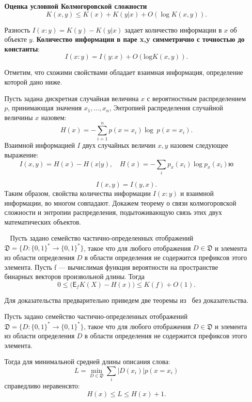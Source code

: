 \documentclass[../main.tex]{subfiles}
\begin{document}
\textbf{Оценка условной Колмогоровской сложности}~\cite{kolmogorov}
\[
	K(x,y) \leq K(x) + K(y|x) + O(\log K(x,y)).
\]


Разность $I(x:y) = K(y) - K(y|x)$ задает количество информации в $x$ об объекте $y$. 
\textbf{Количество информации в паре x,y симметрично с точностью до константы}:
\[
I(x:y) = I(y:x) + O(\text{log}K(x,y)).
\]

Отметим, что схожими свойствами обладает взаимная информация, определение которой дано ниже.

\begin{definition}
Пусть задана дискретная случайная величина $x$ с вероятностным распределением $p$, принимающая значения $x_1, \dots, x_n$,
Энтропией распределения случайной величины $x$ назовем:
\[
	H(x) = -\sum_{i=1}^n p(x = x_i) \log~p(x = x_i).
\]
Взаимной информацией $I$ двух случайных величин $x,y$ назовем следующее выражение:
\[
	I(x,y) = H(x) - H(x|y), \quad H(x) = - \sum_{i} p_x(x_i) \log p_x(x_i)ю
\]
\end{definition}


\[
	I(x,y) = I(y,x).
\]
Таким образом, свойства количества информации $I(x:y)$ и взаимной информации, во многом совпадают. Докажем теорему о связи колмогоровской сложности и энтропии распределения, подытоживающую связь этих двух математических объектов.

\begin{theorem}~\cite{grun_ks} 
Пусть задано семейство частично-определенных отображений $\mathfrak{D} = \{D: \{0,1\}^{*} \to \{0,1\}^{*}\}$,
такое что для любого отображения $D \in \mathfrak{D}$ и элемента из области определения $D$ в области определения не содержится префиксов этого элемента.
Пусть f --- вычислимая функция вероятности на пространстве бинарных векторов произвольной длины. Тогда 
\begin{equation}
\label{ks_entropy}
	0 \leq \bigl(\mathsf{E}_f K(X) - H(x) \bigr) \leq K(f)  + O(1).
\end{equation}
\end{theorem}
Для доказательства предварительно приведем две теоремы из~\cite{grun_ks} без доказательства.

\begin{theorembd}
\label{noiseless}
Пусть задано семейство частично-определенных отображений $\mathfrak{D} = \{D: \{0,1\}^{*} \to \{0,1\}^{*}\}$,
такое что для любого отображения $D \in \mathfrak{D}$ и элемента из области определения $D$ в области определения не содержится префиксов этого элемента.

Тогда для минимальной средней длины описания слова:
\[
	L = \min_{D \in \mathfrak{D}}\sum_{i}|D(x_i)|p(x = x_i)
\] 
справедливо неравенсвто:
\[
	H(x) \leq L \leq H(x)+1.
\]
\end{theorembd}
\end{document}
